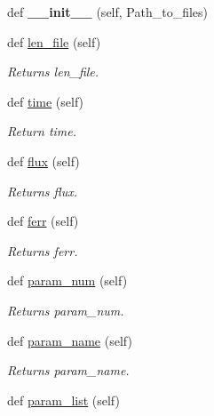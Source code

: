 \begin{DoxyCompactItemize}
\item 
\mbox{\label{classexospec_1_1lc__class_1_1_light_curve_data_ae1113e4e3550f87c8d4339af1c8d1b6e}} 
def {\bfseries \+\_\+\+\_\+init\+\_\+\+\_\+} (self, Path\+\_\+to\+\_\+files)
\item 
def \hyperlink{classexospec_1_1lc__class_1_1_light_curve_data_a33061fe920777987d5cc9936bd112d9e}{len\+\_\+file} (self)
\begin{DoxyCompactList}\small\item\em Returns len\+\_\+file. \end{DoxyCompactList}\item 
def \hyperlink{classexospec_1_1lc__class_1_1_light_curve_data_ad216feba69b805a0732a43555354c76d}{time} (self)
\begin{DoxyCompactList}\small\item\em Return time. \end{DoxyCompactList}\item 
def \hyperlink{classexospec_1_1lc__class_1_1_light_curve_data_a99a2aa168565aa5e6a0b2ec95aa92cff}{flux} (self)
\begin{DoxyCompactList}\small\item\em Returns flux. \end{DoxyCompactList}\item 
def \hyperlink{classexospec_1_1lc__class_1_1_light_curve_data_a4d3d200dc5af76cdd33f610c12ebba83}{ferr} (self)
\begin{DoxyCompactList}\small\item\em Returns ferr. \end{DoxyCompactList}\item 
def \hyperlink{classexospec_1_1lc__class_1_1_light_curve_data_a352d1d2bd0496d7117546a29b2c7cb34}{param\+\_\+num} (self)
\begin{DoxyCompactList}\small\item\em Returns param\+\_\+num. \end{DoxyCompactList}\item 
def \hyperlink{classexospec_1_1lc__class_1_1_light_curve_data_a515e685cc89aae396dc37212cff2e94b}{param\+\_\+name} (self)
\begin{DoxyCompactList}\small\item\em Returns param\+\_\+name. \end{DoxyCompactList}\item 
def \hyperlink{classexospec_1_1lc__class_1_1_light_curve_data_ab383d2dc1788a08a0336cb694f01c906}{param\+\_\+list} (self)

\end{DoxyCompactItemize}
